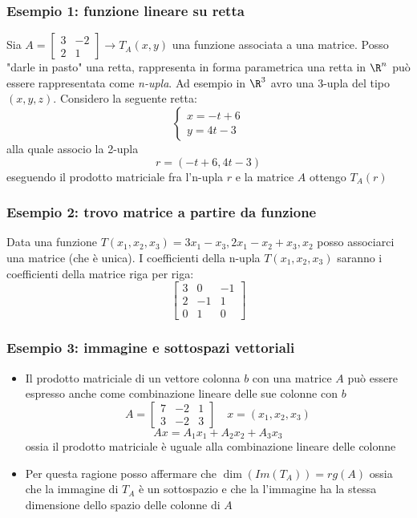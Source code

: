 \documentclass[12pt,a4paper,oneside]{article}
\begin{document}
\subsubsection*{Esempio 1: funzione lineare su retta}
Sia $ A = \begin{bmatrix}
		3 & -2 \\
		2 & 1
	\end{bmatrix} \rightarrow T_A \left( x,y \right) $ una funzione associata a una matrice.
Posso "darle in pasto" una retta, rappresenta in forma parametrica una retta in $ \R^{n} $ può essere rappresentata come \textit{n-upla}. Ad esempio in $ \R^{3} $ avro una 3-upla del tipo $ \left( x,y,z \right)  $. Considero la seguente retta:
\[
	\begin{cases}
		x= -t+6 \\
		y=4t-3
	\end{cases}
\]
alla quale associo la 2-upla
\[
	r = \left( -t + 6 , 4t -3\right)
\]
eseguendo il prodotto matriciale fra l'n-upla $ r $ e la matrice $ A $ ottengo $  T_A\left( r \right) $
\subsubsection*{Esempio 2: trovo matrice a partire da funzione}
Data una funzione $ T\left( x_1,x_2,x_3 \right)  = 3x_1 - x_3, 2x_1 - x_2 + x_3, x_2$ posso associarci una matrice (che è unica). I coefficienti della n-upla $ T\left( x_1,x_2,x_3 \right)  $ saranno i coefficienti della matrice riga per riga:
\[
	\begin{bmatrix}
		3 & 0  & -1 \\
		2 & -1 & 1  \\
		0 & 1  & 0
	\end{bmatrix}
\]
\subsubsection*{Esempio 3: immagine e sottospazi vettoriali}
\begin{itemize}
	\item Il prodotto matriciale di un vettore colonna $ b $ con una matrice $ A $ può essere espresso anche come combinazione lineare delle sue colonne con $ b $
	      \[
		      A =
		      \begin{bmatrix}
			      7 & -2 & 1 \\
			      3 & -2 & 3
		      \end{bmatrix}
		      \quad
		      x=\left( x_1, x_2, x_3 \right)
	      \]
	      \[
		      Ax = A_1 x_1 + A_2x_2 + A_3 x_3
	      \]
	      ossia il prodotto matriciale è uguale alla combinazione lineare delle colonne
	\item Per questa ragione posso affermare che $ \dim \left( Im\left( T_A \right)  \right) = rg \left( A \right)  $ ossia che la immagine di $ T_A $ è un sottospazio e che la l'immagine ha la stessa dimensione dello spazio delle colonne di $ A $
\end{itemize}
\end{document}
